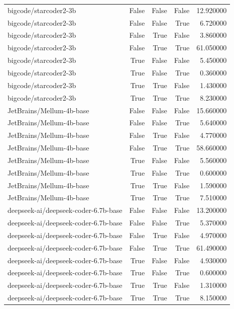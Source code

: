 \begin{tabular}{lrrrr}
bigcode/starcoder2-3b & False & False & False & 12.920000 \\
bigcode/starcoder2-3b & False & False & True & 6.720000 \\
bigcode/starcoder2-3b & False & True & False & 3.860000 \\
bigcode/starcoder2-3b & False & True & True & 61.050000 \\
bigcode/starcoder2-3b & True & False & False & 5.450000 \\
bigcode/starcoder2-3b & True & False & True & 0.360000 \\
bigcode/starcoder2-3b & True & True & False & 1.430000 \\
bigcode/starcoder2-3b & True & True & True & 8.230000 \\
JetBrains/Mellum-4b-base & False & False & False & 15.660000 \\
JetBrains/Mellum-4b-base & False & False & True & 5.640000 \\
JetBrains/Mellum-4b-base & False & True & False & 4.770000 \\
JetBrains/Mellum-4b-base & False & True & True & 58.660000 \\
JetBrains/Mellum-4b-base & True & False & False & 5.560000 \\
JetBrains/Mellum-4b-base & True & False & True & 0.600000 \\
JetBrains/Mellum-4b-base & True & True & False & 1.590000 \\
JetBrains/Mellum-4b-base & True & True & True & 7.510000 \\
deepseek-ai/deepseek-coder-6.7b-base & False & False & False & 13.200000 \\
deepseek-ai/deepseek-coder-6.7b-base & False & False & True & 5.370000 \\
deepseek-ai/deepseek-coder-6.7b-base & False & True & False & 4.970000 \\
deepseek-ai/deepseek-coder-6.7b-base & False & True & True & 61.490000 \\
deepseek-ai/deepseek-coder-6.7b-base & True & False & False & 4.930000 \\
deepseek-ai/deepseek-coder-6.7b-base & True & False & True & 0.600000 \\
deepseek-ai/deepseek-coder-6.7b-base & True & True & False & 1.310000 \\
deepseek-ai/deepseek-coder-6.7b-base & True & True & True & 8.150000 \\
\bottomrule
\end{tabular}
